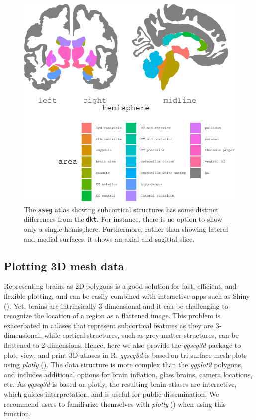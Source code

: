 \documentclass[fleqn,10pt]{wlpeerj} %
\begin{document}
\begin{figure}
\centering
\includegraphics{msc_ggseg_files/figure-latex/atlases-1.pdf}
\caption{\label{fig:atlases}The \texttt{aseg} atlas showing subcortical structures has some distinct differences from the \texttt{dkt}. For instance, there is no option to show only a single hemisphere. Furthermore, rather than showing lateral and medial surfaces, it shows an axial and sagittal slice.}
\end{figure}

\hypertarget{plotting-3d-mesh-data}{%
\subsection{Plotting 3D mesh data}\label{plotting-3d-mesh-data}}

Representing brains as 2D polygons is a good solution for fast, efficient, and flexible plotting, and can be easily combined with interactive apps such as Shiny (\citet{shiny}).
Yet, brains are intrinsically 3-dimensional and it can be challenging to recognize the location of a region as a flattened image.
This problem is exacerbated in atlases that represent subcortical features as they are 3-dimensional, while cortical structures, such as grey matter structures, can be flattened to 2-dimensions.
Hence, here we also provide the \emph{ggseg3d} package to plot, view, and print 3D-atlases in R.
\emph{ggseg3d} is based on tri-surface mesh plots using \emph{plotly} (\citet{plotly}).
The data structure is more complex than the \emph{ggplot2} polygons, and includes additional options for brain inflation, glass brains, camera locations, etc.
As \emph{ggseg3d} is based on plotly, the resulting brain atlases are interactive, which guides interpretation, and is useful for public dissemination.
We recommend users to familiarize themselves with \emph{plotly} (\citet{plotly}) when using this function.
\end{document}
